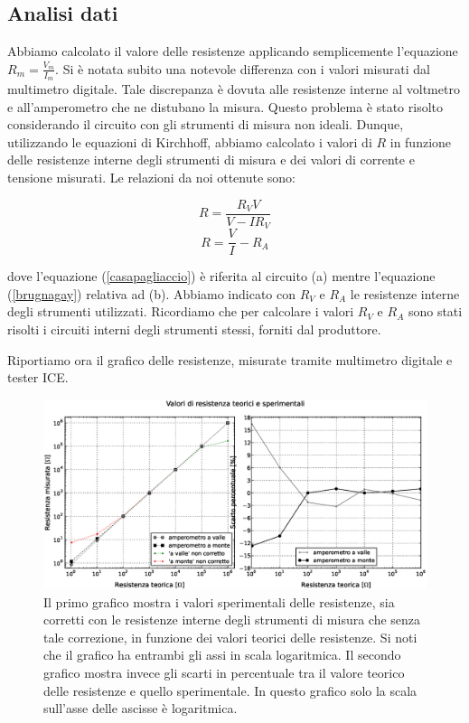 \subsection{Analisi dati}

Abbiamo calcolato il valore delle resistenze applicando semplicemente l'equazione $R_m=\frac{V_m}{I_m}$. Si è notata subito una notevole differenza con i valori misurati dal multimetro digitale. Tale discrepanza è dovuta alle resistenze interne al voltmetro e all'amperometro che ne distubano la misura. Questo problema è stato risolto considerando il circuito con gli strumenti di misura non ideali. Dunque, utilizzando le equazioni di Kirchhoff, abbiamo calcolato i valori di $R$ in funzione delle resistenze interne degli strumenti di misura e dei valori di corrente e tensione misurati. Le relazioni da noi ottenute sono:
\begin{multicols}{2}
%
\begin{equation}
R=\frac{R_VV}{V-IR_V}
\label{casapagliaccio}
\end{equation}
\begin{equation}
R=\frac{V}{I}-R_A
\label{brugnagay}
\end{equation}

\end{multicols} 

dove l'equazione (\ref{casapagliaccio}) è riferita al circuito (a) mentre l'equazione (\ref{brugnagay}) relativa ad (b). Abbiamo indicato con $R_V$ e $R_A$ le resistenze interne degli strumenti utilizzati. 
Ricordiamo che per calcolare i valori $R_V$ e $R_A$ sono stati risolti i circuiti interni degli strumenti stessi, forniti dal produttore. 

Riportiamo ora il grafico delle resistenze, misurate tramite multimetro digitale e tester ICE. 

\begin{figure}[h]
    \centering
        \includegraphics[width=\textwidth]{Res.eps}%
        \caption{Il primo grafico mostra i valori sperimentali delle resistenze, sia corretti con le resistenze interne degli strumenti di misura che senza tale correzione, in funzione dei valori teorici delle resistenze. Si noti che il grafico ha entrambi gli assi in scala logaritmica. Il secondo grafico mostra invece gli scarti in percentuale tra il valore teorico delle resistenze e quello sperimentale. In questo grafico solo la scala sull'asse delle ascisse è logaritmica.}
        \label{fig:resistenze}
\end{figure}

